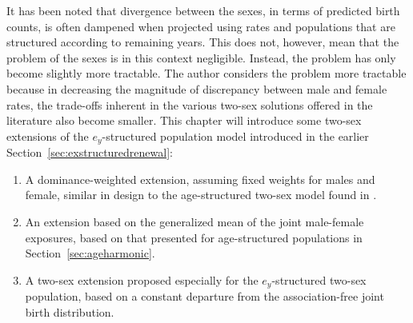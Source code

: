  \FloatBarrier

It has been noted that divergence between the sexes, in terms of predicted birth
counts, is often dampened when projected using rates and populations that are
structured according to remaining years. This does not, however, mean that the
problem of the sexes is in this context negligible. Instead, the problem has
only become slightly more tractable. The author considers the problem more
tractable because in decreasing the magnitude of discrepancy between male and female
rates, the trade-offs inherent in the various two-sex solutions offered in the
literature also become smaller. This chapter will introduce some two-sex
extensions of the $e_y$-structured population model introduced in the earlier
Section~\ref{sec:exstructuredrenewal}:
\begin{enumerate}
  \item A dominance-weighted extension, assuming fixed weights for males and
  female, similar in design to the age-structured two-sex model found in
  \citet{goodman1967age}.
  \item An extension based on the generalized mean of the joint male-female
  exposures, based on that presented for age-structured populations in
  Section~\ref{sec:ageharmonic}.
  \item A two-sex extension proposed especially for the $e_y$-structured
  two-sex population, based on a constant departure from the association-free
  joint birth distribution. 
\end{enumerate}